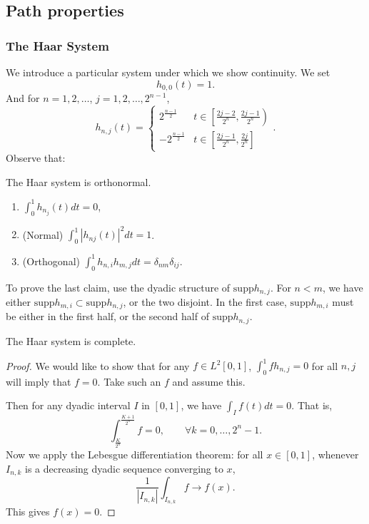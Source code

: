 \subsection{Path properties}

\subsubsection{The Haar System}

We introduce a particular system under which we show continuity. We set
\[
	h_{0,0}(t) = 1
.\] 
And for $n = 1,2,\ldots$, $j = 1,2,\ldots, 2^{n-1}$,
\[
	h_{n,j}(t) = \begin{cases}
		2^{\frac{n - 1}{2}} & t \in \left[ \frac{2 j - 2}{2^n}, \frac{2 j - 1}{2^n} \right)\\
		-2^{\frac{n - 1}{2}} & t \in \left[ \frac{2 j - 1}{2^n}, \frac{2 j}{2^n} \right]
	\end{cases}
.\] 
Observe that:
\begin{proposition}
	The Haar system is orthonormal.
\begin{enumerate}
	\item $\int _0^1 h_{n_j}(t) dt = 0$,
	\item (Normal) $\int _0^1 \left| h_{n j}(t) \right| ^2 dt = 1$.
	\item (Orthogonal) $\int _0^1 h_{n,i} h_{m,j} dt = \delta_{nm}\delta_{ij}$.
\end{enumerate}
\end{proposition}
 To prove the last claim, use the dyadic structure of $\text{supp}h_{n,j}$. For $n < m$, we have either $\text{supp}h_{m, i} \subset \text{supp}h_{n,j}$, or the two disjoint. In the first case, $\text{supp}h_{m,i}$ must be either in the first half, or the second half of $\text{supp} h_{n,j}$. 


\begin{proposition}
	The Haar system is complete.
\end{proposition}
\begin{proof}
	We would like to show that for any $f \in L^2 [0,1]$, $\int _0^1 f h_{n,j} = 0$ for all $n, j$ will imply that $f = 0$. Take such an $f$ and assume this. 

	Then for any dyadic interval $I $ in $[0,1]$, we have $\int _I f(t) dt = 0$. That is,
	\[
		\int _{\frac{K}{2^n}}^{\frac{K+1}{2^n}} f = 0, \qquad \forall k = 0, \ldots, 2^n - 1
	.\] 
	Now we apply the Lebesgue differentiation theorem: for all $x \in [0,1]$, whenever $I_{n, k}$ is a decreasing dyadic sequence converging to $x$,
	\[
		\frac{1}{|I_{n, k}|} \int _{I_{n,k}} f \to f(x)
	.\] 
	This gives $f(x) = 0$.
\end{proof}

